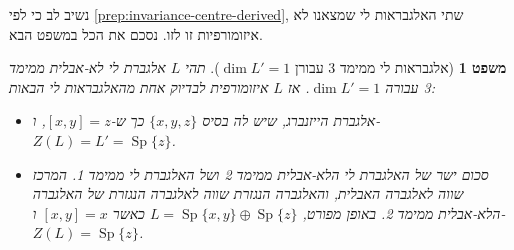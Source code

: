 \documentclass{report}
\theoremstyle{break}
\newtheorem{theorem}{משפט}[chapter]
\theoremstyle{MyNonumberbreak}
\DeclareMathOperator{\Sp}{Sp}
\begin{document}
נשיב לב כי לפי \autoref*{prep:invariance-centre-derived}, שתי האלגבראות לי שמצאנו לא איזומורפיות זו לזו. נסכם את הכל במשפט הבא.
\begin{theorem}[אלגבראות לי ממימד 3 עבורן $\dim L' = 1$] \label{thm:algebras-with-derived-dim-1}
	תהי $L$ אלגברת לי לא-אבלית ממימד 3 עבורה $\dim L' = 1$. אז $L$ איזומורפית לבדיוק אחת מהאלגבראות לי הבאות:
	\begin{itemize}
		\item 
		אלגברת הייזנברג, שיש לה בסיס $\{x, y, z\}$ כך ש-$[x, y] = z$, ו-$Z(L) = L' = \Sp\{z\}$.
		\item
		סכום ישר של האלגברת לי הלא-אבלית ממימד 2 ושל האלגברת לי ממימד 1. המרכז שווה לאלגברה האבלית, והאלגברה הנגזרת שווה לאלגברה הנגזרת של האלגברה הלא-אבלית ממימד 2. באופן מפורט, $L = \Sp\{x, y\} \oplus \Sp\{z\}$ כאשר $[x, y] = x$ ו-$Z(L) = \Sp\{z\}$.
	\end{itemize}
\end{theorem}
\end{document}
